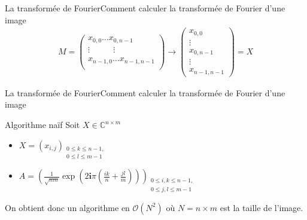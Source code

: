 \begin{frame}{La transformée de Fourier}{Comment calculer la transformée de Fourier d'une image}
	\begin{align*}
		{
		M = 
		\begin{pmatrix}
				x_{0,0} \dots x_{0,n-1} \\
				\vdots \phantom{x_{0} \dots x_{0}} \vdots\\ 
				x_{n-1,0} \dots x_{n-1,n-1} \\
		\end{pmatrix}
		}
		\longrightarrow
		{
		 	\begin{pmatrix}
				x_{0,0}\\
				\vdots\\
				x_{0,n-1}\\
				\vdots\\
				x_{n-1,n-1}
			\end{pmatrix}
		}
		= X
	\end{align*}
\end{frame}

\begin{frame}{La transformée de Fourier}{Comment calculer la transformée de Fourier d'une image}
	\begin{block}{Algorithme naïf}
		Soit \(X \in \mathbb{C}^{n\times m}\)\\
		\begin{itemize}
			\item <2-> \(X = (x_{i,j})_{\substack{0 \leqslant k \leqslant n-1,\\ 0 \leqslant l \leqslant m-1}}\)
			\item <3-> \(A = \left(\frac{1}{\sqrt{nm}}\exp{\left(2\mathbf{i}\pi\left(\frac{ik}{n}+\frac{jl}{m}\right)\right)}\right)_{\substack{0 \leqslant i,k \leqslant n-1,\\ 0 \leqslant j,l \leqslant m-1}}\)
		\end{itemize}
		
	 On obtient donc un algorithme en \(\mathcal{O}(N^2)\) où \(N=n\times m\) est la taille de l'image.
	\end{block}
\end{frame}

